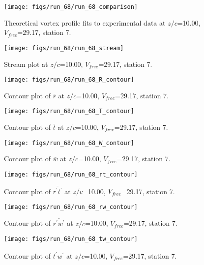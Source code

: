 \begin{figure}[H]
\centering
\texttt{[image: figs/run\_68/run\_68\_comparison]}
\caption{Theoretical vortex profile fits to experimental data at $z/c$=10.00, $V_{free}$=29.17, station 7.}
\label{fig:run_68_comparison}
\end{figure}


\begin{figure}[H]
\centering
\texttt{[image: figs/run\_68/run\_68\_stream]}
\caption{Stream plot at $z/c$=10.00, $V_{free}$=29.17, station 7.}
\label{fig:run_68_stream}
\end{figure}


\begin{figure}[H]
\centering
\texttt{[image: figs/run\_68/run\_68\_R\_contour]}
\caption{Contour plot of $\overline{r}$ at $z/c$=10.00, $V_{free}$=29.17, station 7.}
\label{fig:run_68_R_contour}
\end{figure}


\begin{figure}[H]
\centering
\texttt{[image: figs/run\_68/run\_68\_T\_contour]}
\caption{Contour plot of $\overline{t}$ at $z/c$=10.00, $V_{free}$=29.17, station 7.}
\label{fig:run_68_T_contour}
\end{figure}


\begin{figure}[H]
\centering
\texttt{[image: figs/run\_68/run\_68\_W\_contour]}
\caption{Contour plot of $\overline{w}$ at $z/c$=10.00, $V_{free}$=29.17, station 7.}
\label{fig:run_68_W_contour}
\end{figure}


\begin{figure}[H]
\centering
\texttt{[image: figs/run\_68/run\_68\_rt\_contour]}
\caption{Contour plot of $\overline{r^\prime t^\prime}$ at $z/c$=10.00, $V_{free}$=29.17, station 7.}
\label{fig:run_68_rt_contour}
\end{figure}


\begin{figure}[H]
\centering
\texttt{[image: figs/run\_68/run\_68\_rw\_contour]}
\caption{Contour plot of $\overline{r^\prime w^\prime}$ at $z/c$=10.00, $V_{free}$=29.17, station 7.}
\label{fig:run_68_rw_contour}
\end{figure}


\begin{figure}[H]
\centering
\texttt{[image: figs/run\_68/run\_68\_tw\_contour]}
\caption{Contour plot of $\overline{t^\prime w^\prime}$ at $z/c$=10.00, $V_{free}$=29.17, station 7.}
\label{fig:run_68_tw_contour}
\end{figure}


